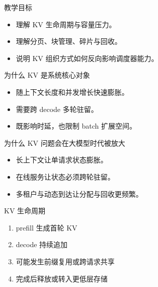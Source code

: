 




\begin{frame}[plain]
  \titlepage
\end{frame}

\begin{frame}{教学目标}
  \begin{itemize}
    \item 理解 KV 生命周期与容量压力。
    \item 理解分页、块管理、碎片与回收。
    \item 说明 KV 组织方式如何反向影响调度器能力。
  \end{itemize}
\end{frame}

\begin{frame}{为什么 KV 是系统核心对象}
  \begin{itemize}
    \item 随上下文长度和并发增长快速膨胀。
    \item 需要跨 decode 多轮驻留。
    \item 既影响时延，也限制 batch 扩展空间。
  \end{itemize}
\end{frame}

\begin{frame}{为什么 KV 问题会在大模型时代被放大}
  \begin{itemize}
    \item 长上下文让单请求状态膨胀。
    \item 在线服务让状态必须跨轮驻留。
    \item 多租户与动态到达让分配与回收更频繁。
  \end{itemize}
\end{frame}

\begin{frame}{KV 生命周期}
  \begin{enumerate}
    \item prefill 生成首轮 KV
    \item decode 持续追加
    \item 可能发生前缀复用或跨请求共享
    \item 完成后释放或转入更低层存储
  \end{enumerate}
\end{frame}

